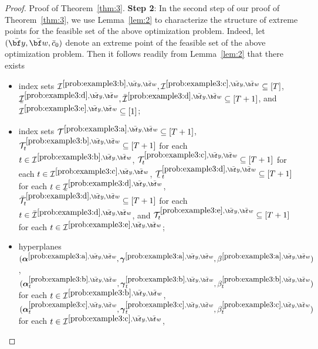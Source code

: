 \documentclass[nonblindrev,mnsc]{informs3} %
\newcommand{\bw}{{\bf w}}
\newcommand{\by}{{\bf y}}
\newcommand{\balpha}{{\boldsymbol{\alpha}}}
\newcommand{\bgamma}{{\boldsymbol{\gamma}}}
\newcommand{\ubar}[1]{\text{\b{$#1$}}}
\begin{document}
\begin{APPENDICES}
\begin{proof}{Proof of Theorem~\ref{thm:3}.}
\vspace{0.5em}
\textbf{Step 2}:   In the second step of our proof of Theorem~\ref{thm:3}, we use Lemma~\ref{lem:2} to characterize the structure of extreme points for the feasible set of the above optimization problem. Indeed, let $(\bar{\by},\bar{\bw},\bar{c}_0)$ denote an extreme point of the feasible set of the above optimization problem. Then it follows readily from Lemma~\ref{lem:2} that there exists 
\begin{itemize}
\item index sets $\mathcal{I}^{\ref{prob:example3:b},\bar{\by},\bar{\bw}}, \mathcal{I}^{\ref{prob:example3:c},\bar{\by},\bar{\bw}} \subseteq [T]$, $\ubar{\mathcal{I}}^{\ref{prob:example3:d},\bar{\by},\bar{\bw}},\bar{\mathcal{I}}^{\ref{prob:example3:d},\bar{\by},\bar{\bw}}  \subseteq [T + 1]$, and $\mathcal{I}^{\ref{prob:example3:e},\bar{\by},\bar{\bw}}  \subseteq [1]$; 
\item index sets $\mathcal{T}^{\ref{prob:example3:a},\bar{\by},\bar{\bw}} \subseteq [T+1]$, $\mathcal{T}^{\ref{prob:example3:b},\bar{\by},\bar{\bw}}_t \subseteq [T+1]$ for each $t \in \mathcal{I}^{\ref{prob:example3:b},\bar{\by},\bar{\bw}}$, $\mathcal{T}^{\ref{prob:example3:c},\bar{\by},\bar{\bw}}_t \subseteq [T+1]$ for each $t \in \mathcal{I}^{\ref{prob:example3:c},\bar{\by},\bar{\bw}}$, $\ubar{\mathcal{T}}^{\ref{prob:example3:d},\bar{\by},\bar{\bw}}_{t} \subseteq [T+1]$ for each $t \in \ubar{\mathcal{I}}^{\ref{prob:example3:d},\bar{\by},\bar{\bw}}$, $\bar{\mathcal{T}}^{\ref{prob:example3:d},\bar{\by},\bar{\bw}}_{t} \subseteq [T+1]$ for each $t \in \bar{\mathcal{I}}^{\ref{prob:example3:d},\bar{\by},\bar{\bw}}$, and  $\mathcal{T}_t^{\ref{prob:example3:e},\bar{\by},\bar{\bw}} \subseteq [T+1]$ for each $t \in \mathcal{I}^{\ref{prob:example3:e},\bar{\by},\bar{\bw}}$; 
\item  hyperplanes $(\balpha^{\ref{prob:example3:a},\bar{\by},\bar{\bw}},\bgamma^{\ref{prob:example3:a},\bar{\by},\bar{\bw}},\beta^{\ref{prob:example3:a},\bar{\by},\bar{\bw}})$, $(\balpha^{\ref{prob:example3:b},\bar{\by},\bar{\bw}}_t,\bgamma^{\ref{prob:example3:b},\bar{\by},\bar{\bw}}_t,\beta^{\ref{prob:example3:b},\bar{\by},\bar{\bw}}_t)$ for each $t \in {\mathcal{I}}^{\ref{prob:example3:b},\bar{\by},\bar{\bw}}$,
$(\balpha^{\ref{prob:example3:c},\bar{\by},\bar{\bw}}_t,\bgamma^{\ref{prob:example3:c},\bar{\by},\bar{\bw}}_t,\beta^{\ref{prob:example3:c},\bar{\by},\bar{\bw}}_t)$ for each $t \in {\mathcal{I}}^{\ref{prob:example3:c},\bar{\by},\bar{\bw}}$, 

\end{itemize}
\end{proof}
\end{APPENDICES}
\end{document}
